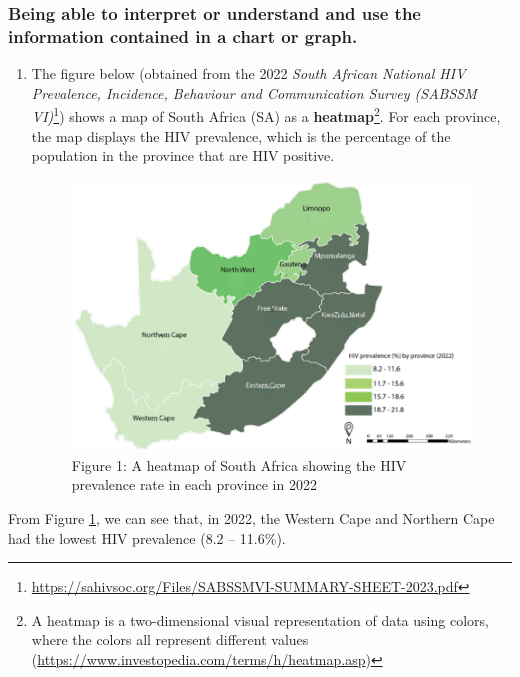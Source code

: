 \documentclass[
]{book}
\begin{document}
\subsubsection{Being able to interpret or understand and use the information contained in a chart or graph.}\label{being-able-to-interpret-or-understand-and-use-the-information-contained-in-a-chart-or-graph.}

\begin{enumerate}
\def\labelenumi{\arabic{enumi}.}
\item
  The figure below (obtained from the 2022 \emph{South African National HIV Prevalence, Incidence, Behaviour and Communication Survey (SABSSM VI)}\footnote{\url{https://sahivsoc.org/Files/SABSSMVI-SUMMARY-SHEET-2023.pdf}}) shows a map of South Africa (SA) as a \textbf{heatmap}\footnote{A heatmap is a two-dimensional visual representation of data using colors, where the colors all represent different values (\url{https://www.investopedia.com/terms/h/heatmap.asp})}. For each province, the map displays the HIV prevalence, which is the percentage of the population in the province that are HIV positive.

  \begin{figure}
  \centering
  \includegraphics[width=5.20833in,height=\textheight]{images/HIV-Prevalence_2022.png}
  \caption{Figure 1: A heatmap of South Africa showing the HIV prevalence rate in each province in 2022}\label{fig1}
  \end{figure}
\end{enumerate}

From Figure \ref{fig1}, we can see that, in 2022, the Western Cape and Northern Cape had the lowest HIV prevalence (8.2 -- 11.6\%).
\end{document}
